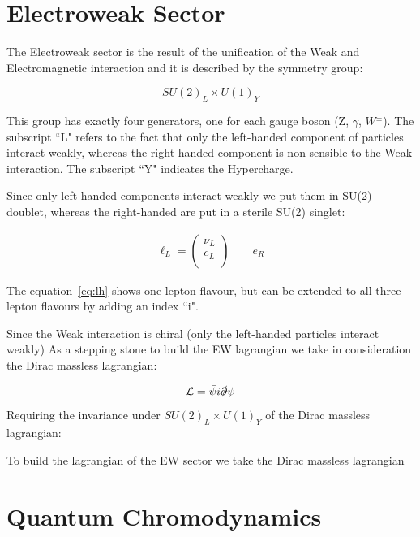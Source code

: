\section{Electroweak Sector}

The Electroweak sector is the result of the unification of the Weak and Electromagnetic interaction and it 
is described by the symmetry group:

\begin{equation}
    SU(2)_L \times U(1)_Y
\end{equation}

This group has exactly four generators, one for each gauge boson (Z, $\gamma$, $W^{\pm}$).
The subscript “L" refers to the fact that only the left-handed component of particles interact weakly, 
whereas the right-handed component is non sensible to the Weak interaction.
The subscript “Y" indicates the Hypercharge.

Since only left-handed components interact weakly we put them in SU(2) doublet, whereas the right-handed
are put in a sterile SU(2) singlet:

\begin{align}
    \ell_L = 
    \begin{pmatrix}
    \nu_L\\
    e_L \\
    \end{pmatrix}
    \qquad
    e_R
\label{eq:lh}
\end{align}

The equation~\ref{eq:lh} shows one lepton flavour, but can be extended to all three lepton flavours by 
adding an index “i".

Since the Weak interaction is chiral (only the left-handed particles interact weakly)
As a stepping stone to build the EW lagrangian we take in consideration the Dirac massless lagrangian:

\begin{equation}
    \mathcal{L} = \bar{\psi} i \slashed{\partial} \psi
\end{equation}
Requiring the invariance under $SU(2)_L \times U(1)_Y$ of the Dirac massless lagrangian:

To build the lagrangian of the EW sector we take the Dirac massless lagrangian 



\section{Quantum Chromodynamics}

